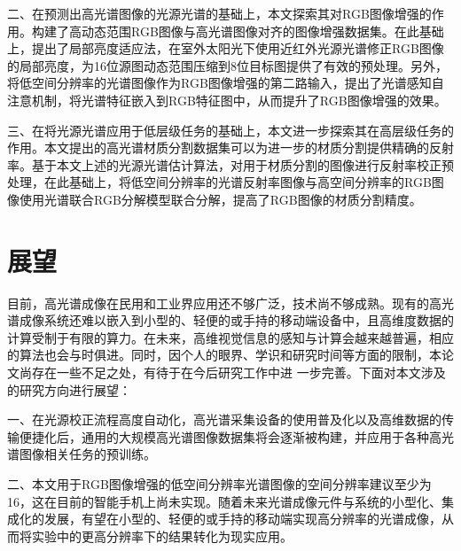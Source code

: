 \documentclass[
    type = master, %
    degree = academic,        %
    decl-page,  %
  ]{njuthesis}
\begin{document}
二、在预测出高光谱图像的光源光谱的基础上，本文探索其对RGB图像增强的作用。构建了高动态范围RGB图像与高光谱图像对齐的图像增强数据集。在此基础上，提出了局部亮度适应法，在室外太阳光下使用近红外光源光谱修正RGB图像的局部亮度，为16位源图动态范围压缩到8位目标图提供了有效的预处理。另外，将低空间分辨率的光谱图像作为RGB图像增强的第二路输入，提出了光谱感知自注意机制，将光谱特征嵌入到RGB特征图中，从而提升了RGB图像增强的效果。

三、在将光源光谱应用于低层级任务的基础上，本文进一步探索其在高层级任务的作用。本文提出的高光谱材质分割数据集可以为进一步的材质分割提供精确的反射率。基于本文上述的光源光谱估计算法，对用于材质分割的图像进行反射率校正预处理，在此基础上，将低空间分辨率的光谱反射率图像与高空间分辨率的RGB图像使用光谱联合RGB分解模型联合分解，提高了RGB图像的材质分割精度。

\section{展望}
目前，高光谱成像在民用和工业界应用还不够广泛，技术尚不够成熟。现有的高光谱成像系统还难以嵌入到小型的、轻便的或手持的移动端设备中，且高维度数据的计算受制于有限的算力。在未来，高维视觉信息的感知与计算会越来越普遍，相应的算法也会与时俱进。同时，因个人的眼界、学识和研究时间等方面的限制，本论文尚存在一些不足之处，有待于在今后研究工作中进
一步完善。下面对本文涉及的研究方向进行展望：


一、在光源校正流程高度自动化，高光谱采集设备的使用普及化以及高维数据的传输便捷化后，通用的大规模高光谱图像数据集将会逐渐被构建，并应用于各种高光谱图像相关任务的预训练。

二、本文用于RGB图像增强的低空间分辨率光谱图像的空间分辨率建议至少为16，这在目前的智能手机上尚未实现。随着未来光谱成像元件与系统的小型化、集成化的发展，有望在小型的、轻便的或手持的移动端实现高分辨率的光谱成像，从而将实验中的更高分辨率下的结果转化为现实应用。
\end{document}
